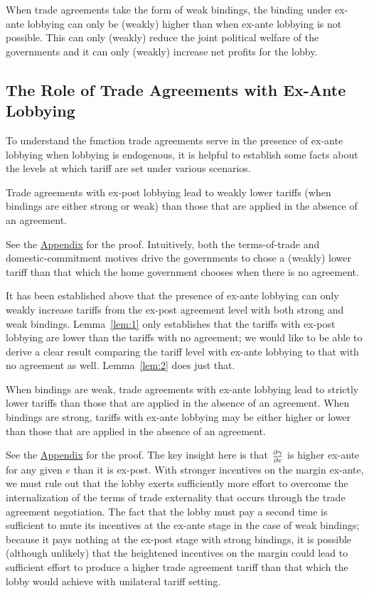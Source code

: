 \begin{result}
	When trade agreements take the form of weak bindings, the binding under ex-ante lobbying can only be (weakly) higher than when ex-ante lobbying is not possible. This can only (weakly) reduce the joint political welfare of the governments and it can only (weakly) increase net profits for the lobby.
\end{result}

\subsection{The Role of Trade Agreements with Ex-Ante Lobbying}				
To understand the function trade agreements serve in the presence of ex-ante lobbying when lobbying is endogenous, it is helpful to establish some facts about the levels at which tariff are set under various scenarios.

\begin{lemma}
  Trade agreements with ex-post lobbying lead to weakly lower tariffs (when bindings are either strong or weak) than those that are applied in the absence of an agreement.
	\label{lem:1}
\end{lemma}

See the \hyperlink{lem1}{Appendix} for the proof. Intuitively, both the terms-of-trade and domestic-commitment motives drive the governments to chose a (weakly) lower tariff than that which the home government chooses when there is no agreement.

It has been established above that the presence of ex-ante lobbying can only weakly increase tariffs from the ex-post agreement level with both strong and weak bindings. Lemma~\ref{lem:1} only establishes that the tariffs with ex-post lobbying are lower than the tariffs with no agreement; we would like to be able to derive a clear result comparing the tariff level with ex-ante lobbying to that with no agreement as well. Lemma~\ref{lem:2} does just that.

\begin{lemma}
  When bindings are weak, trade agreements with ex-ante lobbying lead to strictly lower tariffs than those that are applied in the absence of an agreement. When bindings are strong, tariffs with ex-ante lobbying may be either higher or lower than those that are applied in the absence of an agreement.
	\label{lem:2}
\end{lemma}

See the \hyperlink{lem1}{Appendix} for the proof. The key insight here is that $\frac{\partial \gamma}{\partial e}$ is higher ex-ante for any given $e$ than it is ex-post. With stronger incentives on the margin ex-ante, we must rule out that the lobby exerts sufficiently more effort to overcome the internalization of the terms of trade externality that occurs through the trade agreement negotiation. The fact that the lobby must pay a second time is sufficient to mute its incentives at the ex-ante stage in the case of weak bindings; because it pays nothing at the ex-post stage with strong bindings, it is possible (although unlikely) that the heightened incentives on the margin could lead to sufficient effort to produce a higher trade agreement tariff than that which the lobby would achieve with unilateral tariff setting. 


